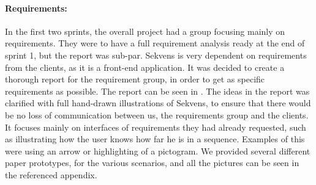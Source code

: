 \paragraph{Requirements:}
In the first two sprints, the overall project had a group focusing mainly on requirements. They were to have a full requirement analysis ready at the end of sprint 1, but the report was sub-par. Sekvens is very dependent on requirements from the clients, as it is a front-end application. It was decided to create a thorough report for the requirement group, in order to get as specific requirements as possible. The report can be seen in . The ideas in the report was clarified with full hand-drawn illustrations of Sekvens, to ensure that there would be no loss of communication between us, the requirements group and the clients. It focuses mainly on interfaces of requirements they had already requested, such as illustrating how the user knows how far he is in a sequence. Examples of this were using an arrow or highlighting of a pictogram. We provided several different paper prototypes, for the various scenarios, and all the pictures can be seen in the referenced appendix.
